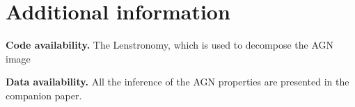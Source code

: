 \documentclass{natureprintstyle}
\newcommand{\lenstronomy}{{\sc Lenstronomy}}
\begin{document}
\section*{Additional information}
\textbf{Code availability.} The \lenstronomy, which is used to decompose the AGN image  

\textbf{Data availability.} All the inference of the AGN properties are presented in the companion paper.




%
%
\end{document}
